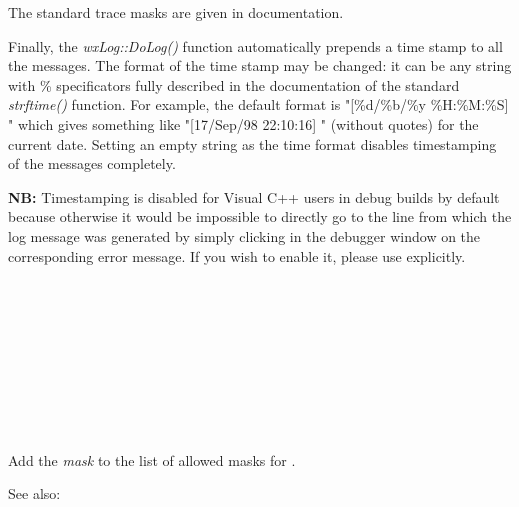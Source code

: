 The standard trace masks are given in  
documentation.

Finally, the {\it wxLog::DoLog()} function automatically prepends a time stamp
to all the messages. The format of the time stamp may be changed: it can be
any string with \% specificators fully described in the documentation of the
standard {\it strftime()} function. For example, the default format is
"[\%d/\%b/\%y \%H:\%M:\%S] " which gives something like "[17/Sep/98 22:10:16] "
(without quotes) for the current date. Setting an empty string as the time
format disables timestamping of the messages completely.

{\bf NB:} Timestamping is disabled for Visual C++ users in debug builds by
default because otherwise it would be impossible to directly go to the line
from which the log message was generated by simply clicking in the debugger
window on the corresponding error message. If you wish to enable it, please use 
 explicitly.

\\
\\
\\
\\
\\
\\
\\
\\


\label{wxlogaddtracemask}


Add the {\it mask} to the list of allowed masks for 
.

See also: 

\label{wxlogonlog}


